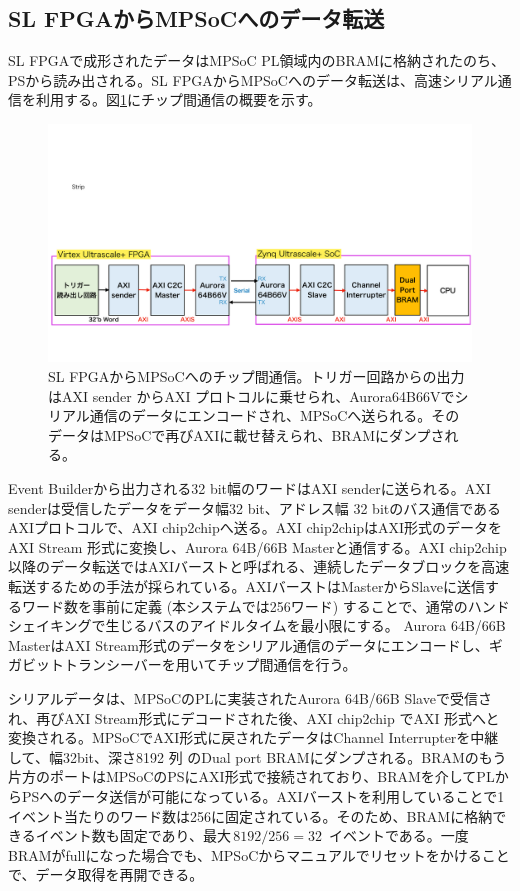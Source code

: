 \subsection*{SL FPGAからMPSoCへのデータ転送}
SL FPGAで成形されたデータはMPSoC PL領域内のBRAMに格納されたのち、PSから読み出される。SL FPGAからMPSoCへのデータ転送は、高速シリアル通信を利用する。図\ref{C2C}にチップ間通信の概要を示す。
\begin{figure} 
\centering
\includegraphics[width=16cm]{fig/Test/C2C.pdf}
\caption[SL FPGAからMPSoCへのチップ間通信]{SL FPGAからMPSoCへのチップ間通信。トリガー回路からの出力はAXI sender からAXI プロトコルに乗せられ、Aurora64B66Vでシリアル通信のデータにエンコードされ、MPSoCへ送られる。そのデータはMPSoCで再びAXIに載せ替えられ、BRAMにダンプされる。}
\label{C2C}
\end{figure}

Event Builderから出力される32 bit幅のワードはAXI senderに送られる。AXI senderは受信したデータをデータ幅32 bit、アドレス幅 32 bitのバス通信であるAXIプロトコルで、AXI chip2chipへ送る。AXI chip2chipはAXI形式のデータをAXI Stream 形式に変換し、Aurora 64B/66B Masterと通信する。AXI chip2chip以降のデータ転送ではAXIバーストと呼ばれる、連続したデータブロックを高速転送するための手法が採られている。AXIバーストはMasterからSlaveに送信するワード数を事前に定義 (本システムでは256ワード) することで、通常のハンドシェイキングで生じるバスのアイドルタイムを最小限にする。
Aurora 64B/66B MasterはAXI Stream形式のデータをシリアル通信のデータにエンコードし、ギガビットトランシーバーを用いてチップ間通信を行う。

シリアルデータは、MPSoCのPLに実装されたAurora 64B/66B Slaveで受信され、再びAXI Stream形式にデコードされた後、AXI chip2chip でAXI 形式へと変換される。MPSoCでAXI形式に戻されたデータはChannel Interrupterを中継して、幅32bit、深さ8192 列 のDual port BRAMにダンプされる。BRAMのもう片方のポートはMPSoCのPSにAXI形式で接続されており、BRAMを介してPLからPSへのデータ送信が可能になっている。AXIバーストを利用していることで1イベント当たりのワード数は256に固定されている。そのため、BRAMに格納できるイベント数も固定であり、最大$ \,8192 / 256 = 32\,$ イベントである。一度BRAMがfullになった場合でも、MPSoCからマニュアルでリセットをかけることで、データ取得を再開できる。

